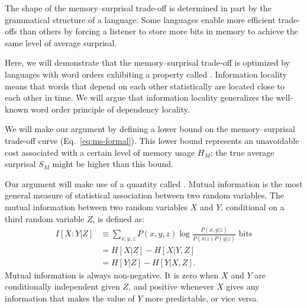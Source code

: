 The shape of the memory--surprisal trade-off is determined in part by the grammatical structure of a language.
Some languages enable more efficient trade-offs than others by forcing a listener to store more bits in memory to achieve the same level of average surprisal.

Here, we will demonstrate that the memory--surprisal trade-off is optimized by languages with word orders exhibiting a property called . Information locality means that words that depend on each other statistically are located close to each other in time. We will argue that information locality generalizes the well-known word order principle of dependency locality.

We will make our argument by defining a lower bound on the memory--surprisal trade-off curve (Eq.~\ref{eq:ms-formal}). This lower bound represents an unavoidable cost associated with a certain level of memory usage $H_M$; the true average surprisal $S_M$ might be higher than this bound. 

Our argument will make use of a quantity called . Mutual information is the most general measure of statistical association between two random variables. The mutual information between two random variables $X$ and $Y$, conditional on a third random variable $Z$, is defined as:
\begin{align}
\label{eq:mi}
    I[X:Y|Z] &\equiv \sum_{x,y,z} P(x,y,z) \log \frac{P(x,y|z)}{P(x|z)P(y|z)} \text{ bits} \\
    \nonumber
    &= H[X|Z] - H[X|Y,Z] \\
    \nonumber
    &= H[Y|Z] - H[Y|X,Z].
\end{align}
Mutual information is always non-negative. It is zero when $X$ and $Y$ are conditionally independent given $Z$, and positive whenever $X$ gives any information that makes the value of $Y$ more predictable, or vice versa. 


